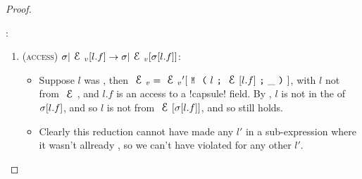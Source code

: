 \begin{proof}
\begin{ienumerate}
\item \HNO:
\begin{enumerate}
	\item (\textsc{access}) $\s|\EV[l.f]\rightarrow \s|\EV[\s[l.f]]$:
	\begin{itemize}
		\item Suppose $l$ was \HNO, then $\EV = \EV'[\M{l}{\E[l.f]}{\_}]$, with $l$ not \reach from $\E$, and $l.f$ is an access to a \Q!capsule! field. By \HNC, $l$ is not in the \rog of $\sigma[l.f]$, and so $l$ is not \reach from $\E[\s[l.f]]$, and so \HNO still holds.
		\item Clearly this reduction cannot have made any $l'$ \reach in a sub-expression where it wasn't allready \reach, so we can't have violated \HNO for any other $l'$.
	\end{itemize}



\end{enumerate}
\end{ienumerate}
\end{proof}
